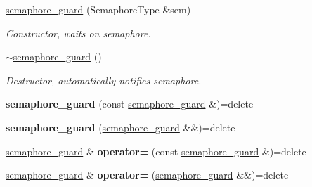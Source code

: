 \begin{DoxyCompactItemize}
\item 
\hyperlink{classcpen333_1_1thread_1_1semaphore__guard_a0704e609f573247313eb66722b6ff145}{semaphore\+\_\+guard} (Semaphore\+Type \&sem)
\begin{DoxyCompactList}\small\item\em Constructor, waits on semaphore. \end{DoxyCompactList}\item 
\mbox{\label{classcpen333_1_1thread_1_1semaphore__guard_a385daa9ae4e31be8403fda90fb57cdd8}} 
\hyperlink{classcpen333_1_1thread_1_1semaphore__guard_a385daa9ae4e31be8403fda90fb57cdd8}{$\sim$semaphore\+\_\+guard} ()
\begin{DoxyCompactList}\small\item\em Destructor, automatically notifies semaphore. \end{DoxyCompactList}\item 
\mbox{\label{classcpen333_1_1thread_1_1semaphore__guard_a9242b838d08f6d7b8995d9921d82dca5}} 
{\bfseries semaphore\+\_\+guard} (const \hyperlink{classcpen333_1_1thread_1_1semaphore__guard}{semaphore\+\_\+guard} \&)=delete
\item 
\mbox{\label{classcpen333_1_1thread_1_1semaphore__guard_a39302522fb3aadfa83f05e68f40c0df5}} 
{\bfseries semaphore\+\_\+guard} (\hyperlink{classcpen333_1_1thread_1_1semaphore__guard}{semaphore\+\_\+guard} \&\&)=delete
\item 
\mbox{\label{classcpen333_1_1thread_1_1semaphore__guard_a2e2272075b5b2a55464b7139dc7dfa3e}} 
\hyperlink{classcpen333_1_1thread_1_1semaphore__guard}{semaphore\+\_\+guard} \& {\bfseries operator=} (const \hyperlink{classcpen333_1_1thread_1_1semaphore__guard}{semaphore\+\_\+guard} \&)=delete
\item 
\mbox{\label{classcpen333_1_1thread_1_1semaphore__guard_abedb320c762ffc6a8556da9ee8fcac8d}} 
\hyperlink{classcpen333_1_1thread_1_1semaphore__guard}{semaphore\+\_\+guard} \& {\bfseries operator=} (\hyperlink{classcpen333_1_1thread_1_1semaphore__guard}{semaphore\+\_\+guard} \&\&)=delete
\end{DoxyCompactItemize}


